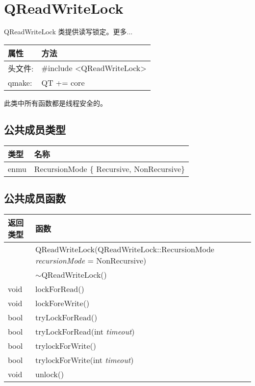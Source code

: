 \chapter{QReadWriteLock}

QReadWriteLock 类提供读写锁定。更多...

\begin{tabular}{|l|l|}
\hline
属性 &	方法\\
\hline
头文件:& 	\#include <QReadWriteLock>\\
\hline
qmake:& 	QT += core\\
\hline
\end{tabular}

\begin{notice}
此类中所有函数都是线程安全的。
\end{notice}

\section{公共成员类型}

\begin{tabular}{|l|l|}
\hline
类型 &	名称\\
\hline
enmu 	& RecursionMode \{ Recursive, NonRecursive\}\\
\hline
\end{tabular}


\section{公共成员函数}

\begin{tabular}{|l|m{27em}|}
\hline
返回类型 &	函数 \\ 
\hline
& QReadWriteLock(QReadWriteLock::RecursionMode \emph{recursionMode} = NonRecursive) \\
\hline
& $\sim$QReadWriteLock() \\ 
\hline
void &	lockForRead() \\ 
\hline
void &	lockForeWrite() \\ 
\hline
bool &	tryLockForRead()\\ 
\hline
bool &	tryLockForRead(int \emph{timeout}) \\ 
\hline
bool &	trylockForWrite() \\ 
\hline
bool &	trylockForWrite(int \emph{timeout}) \\ 
\hline
void &	unlock() \\ 
\hline
\end{tabular}

